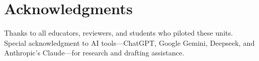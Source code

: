 \chapter*{Acknowledgments}
Thanks to all educators, reviewers, and students who piloted these units.\\
Special acknowledgment to AI tools—ChatGPT, Google Gemini, Deepseek, and Anthropic’s Claude—for research and drafting assistance.
